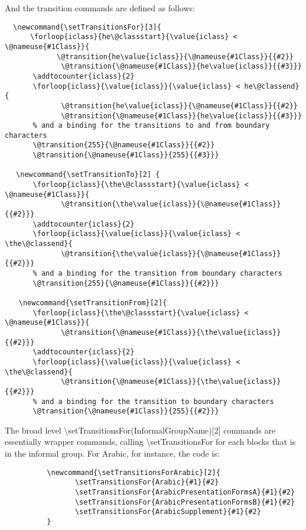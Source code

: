﻿\documentclass{article}
\begin{document}
		And the transition commands are defined as follows:

		\disableTransitionRules
		\begin{verbatim}
  \newcommand{\setTransitionsFor}[3]{
      \forloop{iclass}{he\@classstart}{\value{iclass} < \@nameuse{#1Class}}{
　　　　　    \@transition{he\value{iclass}}{\@nameuse{#1Class}}{{#2}}
　　　　　　　　\@transition{\@nameuse{#1Class}}{he\value{iclass}}{{#3}}}
　　　　\addtocounter{iclass}{2}
　　　　\forloop{iclass}{\value{iclass}}{\value{iclass} < he\@classend}{
　　　　　　　　\@transition{he\value{iclass}}{\@nameuse{#1Class}}{{#2}}
　　　　　　　　\@transition{\@nameuse{#1Class}}{he\value{iclass}}{{#3}}}
　　　　% and a binding for the transitions to and from boundary characters
　　　　\@transition{255}{\@nameuse{#1Class}}{{#2}}
　　　　\@transition{\@nameuse{#1Class}}{255}{{#3}}}
　　　　　　
 　\newcommand{\setTransitionTo}[2] {
　　　　\forloop{iclass}{\the\@classstart}{\value{iclass} < \@nameuse{#1Class}}{
　　　　　　　　\@transition{\the\value{iclass}}{\@nameuse{#1Class}}{{#2}}}
　　　　\addtocounter{iclass}{2}
　　　　\forloop{iclass}{\value{iclass}}{\value{iclass} < \the\@classend}{
　　　　　　　　\@transition{\the\value{iclass}}{\@nameuse{#1Class}}{{#2}}}
　　　　% and a binding for the transition from boundary characters
　　　　\@transition{255}{\@nameuse{#1Class}}{{#2}}}						
　　　　　　
　　\newcommand{\setTransitionFrom}[2]{
　　　　\forloop{iclass}{\the\@classstart}{\value{iclass} < \@nameuse{#1Class}}{
　　　　　　　　\@transition{\@nameuse{#1Class}}{\the\value{iclass}}{{#2}}}
　　　　\addtocounter{iclass}{2}
　　　　\forloop{iclass}{\value{iclass}}{\value{iclass} < \the\@classend}{
　　　　　　　　\@transition{\@nameuse{#1Class}}{\the\value{iclass}}{{#2}}}
　　　　% and a binding for the transition to boundary characters
　　　　\@transition{\@nameuse{#1Class}}{255}{{#2}}}
		\end{verbatim}
		\enableTransitionRules
		
		The broad level \textbackslash setTransitionsFor(InformalGroupName)[2] commands are essentially wrapper commands, calling \textbackslash setTransitionsFor for each blocks that is in the informal group. For Arabic, for instance, the code is:
		
		\disableTransitionRules
		\begin{verbatim}
　　　　　　\newcommand{\setTransitionsForArabic}[2]{
　　　　　　　　　　\setTransitionsFor{Arabic}{#1}{#2}
　　　　　　　　　　\setTransitionsFor{ArabicPresentationFormsA}{#1}{#2}
　　　　　　　　　　\setTransitionsFor{ArabicPresentationFormsB}{#1}{#2}
　　　　　　　　　　\setTransitionsFor{ArabicSupplement}{#1}{#2}
　　　　　　}
		\end{verbatim}
		\enableTransitionRules
		
\end{document}
